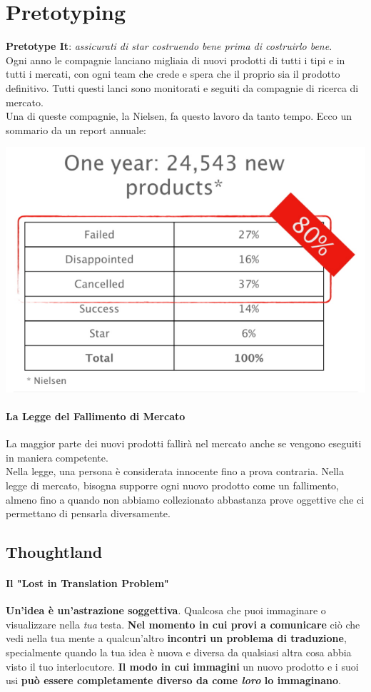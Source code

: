 \documentclass[10pt]{article}
\begin{document}
\section{Pretotyping}
\textbf{Pretotype It}: \textit{assicurati di star costruendo bene prima di costruirlo bene}.\\
Ogni anno le compagnie lanciano migliaia di nuovi prodotti di tutti i tipi e in tutti i mercati, con ogni team che crede e spera che il proprio sia il prodotto definitivo. Tutti questi lanci sono monitorati e seguiti da compagnie di ricerca di mercato.\\
Una di queste compagnie, la Nielsen, fa questo lavoro da tanto tempo. Ecco un sommario da un report annuale:
\begin{center}
\includegraphics[scale=0.7]{nielsen.png}
\end{center}
\paragraph{La Legge del Fallimento di Mercato} La maggior parte dei nuovi prodotti fallirà nel mercato anche se vengono eseguiti in maniera competente.\\
Nella legge, una persona è considerata innocente fino a prova contraria. Nella legge di mercato, bisogna supporre ogni nuovo prodotto come un fallimento, almeno fino a quando non abbiamo collezionato abbastanza prove oggettive che ci permettano di pensarla diversamente.
\subsection{Thoughtland}
\paragraph{Il "Lost in Translation Problem"} \textbf{Un'idea è un'astrazione soggettiva}. Qualcosa che puoi immaginare o visualizzare nella \textit{tua} testa. \textbf{Nel momento in cui provi a comunicare} ciò che vedi nella tua mente a qualcun'altro \textbf{incontri un problema di traduzione}, specialmente quando la tua idea è nuova e diversa da qualsiasi altra cosa abbia visto il tuo interlocutore. \textbf{Il modo in cui immagini} un nuovo prodotto e i suoi usi \textbf{può essere completamente diverso da come \textit{loro} lo immaginano}.
\end{document}
